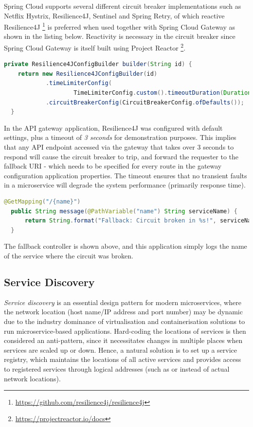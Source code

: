 Spring Cloud supports several different circuit breaker implementations such as Netflix Hystrix, Resilience4J, Sentinel and Spring Retry, of which reactive Resilience4J \footnote{\url{https://github.com/resilience4j/resilience4j}} is preferred when used together with Spring Cloud Gateway as shown in the listing below. Reactivity is necessary in the circuit breaker since Spring Cloud Gateway is itself built using Project Reactor \footnote{\url{https://projectreactor.io/docs}}.

\begin{lstlisting}[language=Java, caption=Circuit breaker configuration in API gateway application.]
  private Resilience4JConfigBuilder builder(String id) {
    return new Resilience4JConfigBuilder(id)
            .timeLimiterConfig(
                    TimeLimiterConfig.custom().timeoutDuration(Duration.ofSeconds(3)).build())
            .circuitBreakerConfig(CircuitBreakerConfig.ofDefaults());
  }
\end{lstlisting}

In the API gateway application, Resilience4J was configured with default settings, plus a timeout of \textit{3 seconds} for demonstration purposes. This implies that any API endpoint accessed via the gateway that takes over 3 seconds to respond will cause the circuit breaker to trip, and forward the requester to the fallback URI - which needs to be specified for every route in the gateway configuration application properties. The timeout ensures that no transient faults in a microservice will degrade the system performance (primarily response time).

\begin{lstlisting}[language=Java, caption=Code snippet from \code{FallbackController.java}.]
  @GetMapping("/{name}")
  public String message(@PathVariable("name") String serviceName) {
      return String.format("Fallback: Circuit broken in %s!", serviceName);
  }
\end{lstlisting}

The fallback controller is shown above, and this application simply logs the name of the service where the circuit was broken.

\subsection{Service Discovery}

\textit{Service discovery} is an essential design pattern for modern microservices, where the network location (host name/IP address and port number) may be dynamic due to the industry dominance of virtualisation and containerisation solutions to run microservice-based applications. Hard-coding the locations of services is then considered an anti-pattern, since it necessitates changes in multiple places when services are scaled up or down. Hence, a natural solution is to set up a service registry, which maintains the locations of all active services and provides access to registered services through logical addresses (such as  or  instead of actual network locations).

